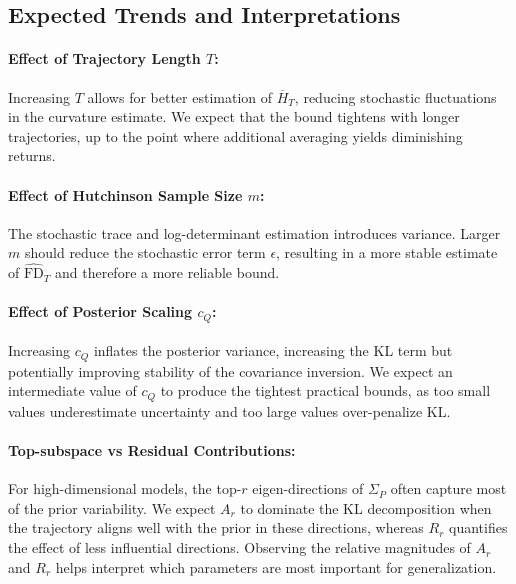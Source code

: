 \subsection{Expected Trends and Interpretations}

\paragraph{Effect of Trajectory Length $T$:}  
Increasing $T$ allows for better estimation of $\overline H_T$, reducing stochastic fluctuations in the curvature estimate. We expect that the bound tightens with longer trajectories, up to the point where additional averaging yields diminishing returns.

\paragraph{Effect of Hutchinson Sample Size $m$:}  
The stochastic trace and log-determinant estimation introduces variance. Larger $m$ should reduce the stochastic error term $\epsilon$, resulting in a more stable estimate of $\widehat{\mathrm{FD}}_T$ and therefore a more reliable bound.

\paragraph{Effect of Posterior Scaling $c_Q$:}  
Increasing $c_Q$ inflates the posterior variance, increasing the KL term but potentially improving stability of the covariance inversion. We expect an intermediate value of $c_Q$ to produce the tightest practical bounds, as too small values underestimate uncertainty and too large values over-penalize KL.

\paragraph{Top-subspace vs Residual Contributions:}  
For high-dimensional models, the top-$r$ eigen-directions of $\Sigma_P$ often capture most of the prior variability. We expect $A_r$ to dominate the KL decomposition when the trajectory aligns well with the prior in these directions, whereas $R_r$ quantifies the effect of less influential directions. Observing the relative magnitudes of $A_r$ and $R_r$ helps interpret which parameters are most important for generalization.

